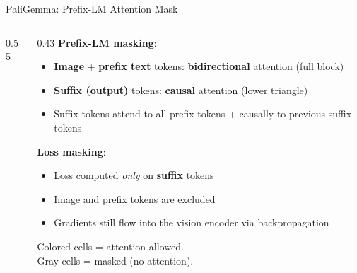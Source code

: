 \begin{frame}{PaliGemma: Prefix-LM Attention Mask}
\begin{columns}
\begin{column}{0.55\textwidth}
\begin{center}
      \end{center}
    \end{column}
    \begin{column}{0.43\textwidth}
      \textbf{Prefix-LM masking}:
      \begin{itemize}
        \item \textcolor{orange!70!black}{\textbf{Image}} + \textcolor{blue!70!black}{\textbf{prefix text}} tokens: \textbf{bidirectional} attention (full block)
        \item \textcolor{green!50!black}{\textbf{Suffix (output)}} tokens: \textbf{causal} attention (lower triangle)
        \item Suffix tokens attend to all prefix tokens + causally to previous suffix tokens
      \end{itemize}

      \vspace{0.3em}
      \textbf{Loss masking}:
      \begin{itemize}
        \item Loss computed \emph{only} on \textcolor{green!50!black}{\textbf{suffix}} tokens
        \item Image and prefix tokens are excluded
        \item Gradients still flow into the vision encoder via backpropagation
      \end{itemize}

      \vspace{0.3em}
      {\small Colored cells = attention allowed.\\
      Gray cells = masked (no attention).}
    \end{column}
  \end{columns}
\end{frame}

